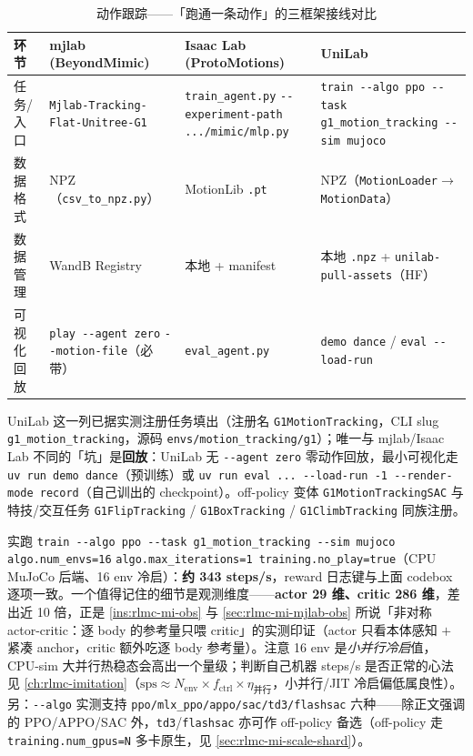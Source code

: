 \begin{table}[ht]
\centering
\small
\caption{动作跟踪——「跑通一条动作」的三框架接线对比}
\label{tab:rlmc-mi-run3}
\begin{tabular}{@{}llll@{}}
\toprule
环节 & mjlab (BeyondMimic) & Isaac Lab (ProtoMotions) & UniLab \\
\midrule
任务/入口 & \verb|Mjlab-Tracking-Flat-Unitree-G1| & \verb|train_agent.py| \verb|--experiment-path .../mimic/mlp.py| & \verb|train --algo ppo --task g1_motion_tracking --sim mujoco| \\
数据格式 & NPZ（\verb|csv_to_npz.py|） & MotionLib \verb|.pt| & NPZ（\verb|MotionLoader|$\to$\verb|MotionData|） \\
数据管理 & WandB Registry & 本地 + manifest & 本地 \verb|.npz| + \verb|unilab-pull-assets|（HF） \\
可视化回放 & \verb|play --agent zero| \verb|--motion-file|（必带） & \verb|eval_agent.py| & \verb|demo dance| / \verb|eval --load-run| \\
\bottomrule
\end{tabular}
\end{table}

UniLab 这一列已据实测注册任务填出（注册名 \verb|G1MotionTracking|，CLI slug \verb|g1_motion_tracking|，源码 \verb|envs/motion_tracking/g1|）；唯一与 mjlab/Isaac Lab 不同的「坑」是\textbf{回放}：UniLab 无 \verb|--agent zero| 零动作回放，最小可视化走 \verb|uv run demo dance|（预训练）或 \verb|uv run eval ... --load-run -1 --render-mode record|（自己训出的 checkpoint）。off-policy 变体 \verb|G1MotionTrackingSAC| 与特技/交互任务 \verb|G1FlipTracking| / \verb|G1BoxTracking| / \verb|G1ClimbTracking| 同族注册。

\begin{note}
实跑 \verb|train --algo ppo --task g1_motion_tracking --sim mujoco algo.num_envs=16| \verb|algo.max_iterations=1 training.no_play=true|（CPU MuJoCo 后端、16 env 冷启）：\textbf{约 343 steps/s}，reward 日志键与上面 codebox 逐项一致。一个值得记住的细节是观测维度——\textbf{actor 29 维、critic 286 维}，差出近 10 倍，正是 \cref{ins:rlmc-mi-obs} 与 \cref{sec:rlmc-mi-mjlab-obs} 所说「非对称 actor-critic：逐 body 的参考量只喂 critic」的实测印证（actor 只看本体感知 $+$ 紧凑 anchor，critic 额外吃逐 body 参考量）。注意 16 env 是\emph{小并行冷启}值，CPU-sim 大并行热稳态会高出一个量级；判断自己机器 steps/s 是否正常的心法见 \cref{ch:rlmc-imitation}（$\text{sps}\approx N_{\text{env}}\times f_{\text{ctrl}}\times \eta_{\text{并行}}$，小并行/JIT 冷启偏低属良性）。另：\verb|--algo| 实测支持 \verb|ppo/mlx_ppo/appo/sac/td3/flashsac| 六种——除正文强调的 PPO/APPO/SAC 外，\verb|td3|/\verb|flashsac| 亦可作 off-policy 备选（off-policy 走 \verb|training.num_gpus=N| 多卡原生，见 \cref{sec:rlmc-mi-scale-shard}）。\end{note}

